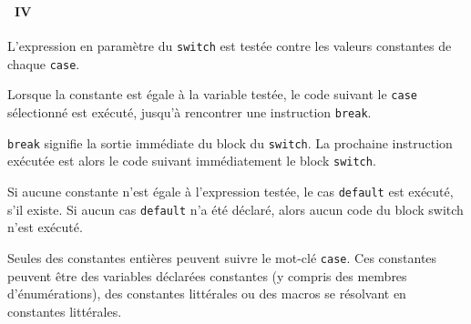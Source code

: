 \begin{frame}[containsverbatim]
  \frametitle{\secname}
  \framesubtitle{\subsecname~IV}

  L'expression en paramètre du \verb|switch| est testée contre les valeurs constantes de chaque \verb|case|. 
  \vspace{0.3cm}
  \par
  Lorsque la constante est égale à la variable testée, le code suivant le \verb|case| sélectionné est exécuté, jusqu'à rencontrer une instruction \verb|break|. 
  \par
  \verb|break| signifie la sortie immédiate du block du \verb|switch|. La prochaine instruction exécutée est alors le code suivant immédiatement le block \verb|switch|.
  \vspace{0.3cm}
  \par
  Si aucune constante n'est égale à l'expression testée, le cas \verb|default| est exécuté, s'il existe. Si aucun cas \verb|default| n'a été déclaré, alors aucun code du 
  block switch n'est exécuté.
  \vspace{0.3cm}
  \par
  Seules des constantes entières peuvent suivre le mot-clé \verb|case|. Ces constantes peuvent être des variables déclarées constantes (y compris des membres d'énumérations), 
  des constantes littérales ou des macros se résolvant en constantes littérales.
\end{frame}

